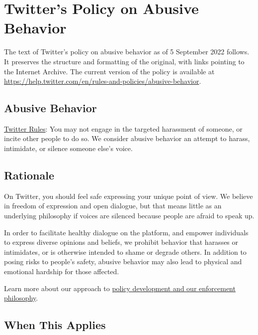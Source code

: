 
\newpage
\section{Twitter's Policy on Abusive Behavior}
\label{adx:twitter:abusive-behavior}

The text of Twitter's policy on abusive behavior as of 5 September 2022 follows.
It preserves the structure and formatting of the original, with links pointing
to the Internet Archive. The current version of the policy is available at
\url{https://help.twitter.com/en/rules-and-policies/abusive-behavior}.


\subsection{Abusive Behavior}

\noindent\href{https://web.archive.org/web/20220905021323/https://help.twitter.com/en/rules-and-policies/twitter-rules.html}{Twitter
Rules}: You may not engage in the targeted harassment of someone, or incite
other people to do so. We consider abusive behavior an attempt to harass,
intimidate, or silence someone else's voice.


\subsection{Rationale}

On Twitter, you should feel safe expressing your unique point of view. We
believe in freedom of expression and open dialogue, but that means little as an
underlying philosophy if voices are silenced because people are afraid to speak
up.

In order to facilitate healthy dialogue on the platform, and empower individuals
to express diverse opinions and beliefs, we prohibit behavior that harasses or
intimidates, or is otherwise intended to shame or degrade others. In addition to
posing risks to people's safety, abusive behavior may also lead to physical and
emotional hardship for those affected.

Learn more about our approach to
\href{https://web.archive.org/web/20220905021323/https://help.twitter.com/en/rules-and-policies/enforcement-philosophy.html}{policy
development and our enforcement philosophy}.


\subsection{When This Applies}

